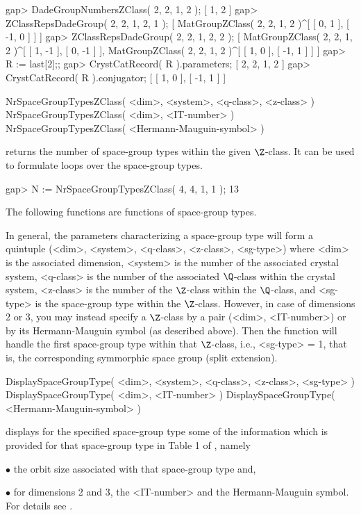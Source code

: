 \beginexample
gap> DadeGroupNumbersZClass( 2, 2, 1, 2 );
[ 1, 2 ]
gap> ZClassRepsDadeGroup( 2, 2, 1, 2, 1 );
[ MatGroupZClass( 2, 2, 1, 2 )^[ [ 0, 1 ], [ -1, 0 ] ] ]
gap> ZClassRepsDadeGroup( 2, 2, 1, 2, 2 );
[ MatGroupZClass( 2, 2, 1, 2 )^[ [ 1, -1 ], [ 0, -1 ] ],
  MatGroupZClass( 2, 2, 1, 2 )^[ [ 1, 0 ], [ -1, 1 ] ] ]
gap> R := last[2];;
gap> CrystCatRecord( R ).parameters;
[ 2, 2, 1, 2 ]
gap> CrystCatRecord( R ).conjugator;
[ [ 1, 0 ], [ -1, 1 ] ]
\endexample


\>NrSpaceGroupTypesZClass( <dim>, <system>, <q-class>, <z-class> )
\>NrSpaceGroupTypesZClass( <dim>, <IT-number> )
\>NrSpaceGroupTypesZClass( <Hermann-Mauguin-symbol> )

returns the number of space-group types within the given $\Z$-class.
It can be used to formulate loops over the space-group types.

\beginexample
gap> N := NrSpaceGroupTypesZClass( 4, 4, 1, 1 );
13
\endexample

The following functions are functions of space-group types.

In general, the parameters characterizing a space-group type will form
a quintuple (<dim>, <system>, <q-class>, <z-class>, <sg-type>) where
<dim> is the associated dimension, <system> is the number of the
associated crystal system, <q-class> is the number of the associated
$\Q$-class within the crystal system, <z-class> is the number of the
$\Z$-class within the $\Q$-class, and <sg-type> is the space-group
type within the $\Z$-class.  However, in case of dimensions 2 or 3,
you may instead specify a $\Z$-class by a pair (<dim>, <IT-number>)
or by its Hermann-Mauguin symbol (as described above).  Then the
function will handle the first space-group type within that
$\Z$-class, i.e., <sg-type> = 1, that is, the corresponding
symmorphic space group (split extension).

\>DisplaySpaceGroupType( <dim>, <system>, <q-class>, <z-class>, <sg-type> )
\>DisplaySpaceGroupType( <dim>, <IT-number> )
\>DisplaySpaceGroupType( <Hermann-Mauguin-symbol> )

displays for the specified space-group type some of the information
which is provided for that space-group type in Table 1 of
\cite{BBNWZ78}, namely
\beginlist
\item{$\bullet$} the orbit size associated with that space-group type and,
\item{$\bullet$} for dimensions  2 and 3,  the <IT-number>  and  the 
    Hermann-Mauguin symbol.
\endlist
For details see \cite{BBNWZ78}.

